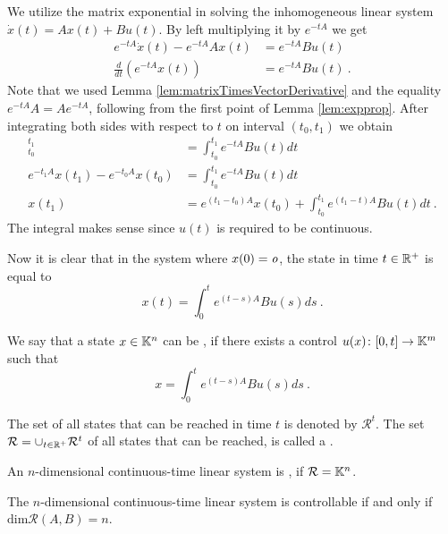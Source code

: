 We utilize the matrix exponential in solving the inhomogeneous linear system $\dot{x}(t)=Ax(t)+Bu(t)$. By left multiplying it by $e^{-tA}$ we get
\begin{align*}
	e^{-tA}\dot{x}(t)-e^{-tA}Ax(t) &=e^{-tA}Bu(t) \\
	\frac{d}{dt} (e^{-tA}x(t)) &=e^{-tA}Bu(t)\ .
\end{align*}
Note that we used Lemma \ref{lem:matrixTimesVectorDerivative} and the equality $e^{-tA}A=Ae^{-tA}$, following from the first point of Lemma \ref{lem:expprop}. After integrating both sides with respect to $t$ on interval $(t_0,t_1)$ we obtain
\begin{align*}
	[e^{-tA}x(t)]^{t_1}_{t_0}&=\int^{t_1}_{t_0}e^{-tA}Bu(t)dt \\
	e^{-t_1A}x(t_1)-e^{-t_0A}x(t_0)&=\int^{t_1}_{t_0}e^{-tA}Bu(t)dt \\
	x(t_1)&=e^{(t_1-t_0)A}x(t_0)+\int^{t_1}_{t_0}e^{(t_1-t)A}Bu(t)dt\ .
\end{align*}
The integral makes sense since $u(t)$ is required to be continuous.

Now it is clear that in the system where $x(0)=\textit{o}$, the state in time $t\in \mathbb{R}^+$ is equal to
\begin{equation}
\label{eq:coolVzorec}
	x(t)=\int^t_0 e^{(t-s)A}Bu(s)ds\ .
\end{equation}

\begin{definition}
	We say that a state $x\in\mathbb{K}^n$ can be , if there exists a control $u(x)\colon[0,t]\rightarrow\mathbb{K}^m$ such that
	$$x=\int^t_0 e^{(t-s)A}Bu(s)ds\ .$$

	The set of all states that can be reached in time $t$ is denoted by $\mathcal{R}^t$. The set $\mathcal{R}=\cup_{t\in\mathbb{R}^+}\mathcal{R}^t$ of all states that can be reached, is called a .
\end{definition}

\begin{definition}
	An $n$-dimensional continuous-time linear system is , if $\mathcal{R}=\mathbb{K}^n$.
\end{definition}

\begin{theorem}
\label{theorem:controllabilityContinuous}
	The $n$-dimensional continuous-time linear system is controllable if and only if $\text{dim}\mathcal{R}(A,B)=n$.
\end{theorem}

